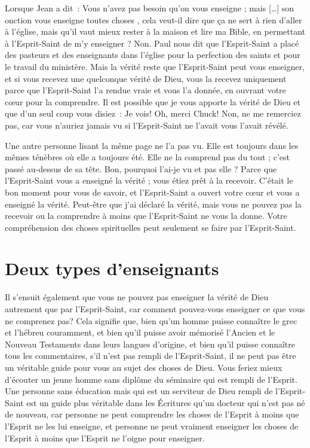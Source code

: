 \begin{specialpar}{}
Lorsque Jean a dit~:
 \og Vous n'avez pas besoin qu'on vous enseigne ;
 mais [\dots{}] son onction vous enseigne toutes choses \fg{},
 cela veut-il dire que ça ne sert à rien d'aller à l'église,
 mais qu'il vaut mieux rester à la maison et lire ma Bible,
 en permettant à l'Esprit-Saint de m'y enseigner ? Non.
 Paul nous dit que l'Esprit-Saint a placé des pasteurs
 et des enseignants dans l'église pour la perfection des saints
 et pour le travail du ministère.
 Mais la vérité reste que l'Esprit-Saint peut vous enseigner,
 et si vous recevez une quelconque vérité de Dieu,
 vous la recevez uniquement parce que l'Esprit-Saint
 l'a rendue vraie et vous l'a donnée, en ouvrant votre cœur
 pour la comprendre.
 Il est possible que je vous apporte la vérité de Dieu
 et que d'un seul coup vous disiez~: \og Je vois!
 Oh, merci Chuck! \fg{} Non, ne me remerciez pas,
 car vous n'auriez jamais vu si l'Esprit-Saint
 ne l'avait vous l'avait révélé.
\end{specialpar}

Une autre personne lisant la même page ne l'a pas vu.
 Elle est toujours dans les mêmes ténèbres où elle a toujours été.
 Elle ne la comprend pas du tout ; c'est passé au-dessus de sa tête.
 \og Bon, pourquoi l'ai-je vu et pas elle ? \fg{}
 Parce que l'Esprit-Saint vous a enseigné la vérité ;
 vous étiez prêt à la recevoir.
 C'était le bon moment pour vous de savoir, et l'Esprit-Saint
 a ouvert votre cœur et vous a enseigné la vérité.
 Peut-être que j'ai déclaré la vérité, mais vous ne pouvez pas la recevoir
 ou la comprendre à moins que l'Esprit-Saint ne vous la donne.
 Votre compréhension des choses spirituelles peut seulement se faire
 par l'Esprit-Saint.


\section*{Deux types d'enseignants}

Il s'ensuit également que vous ne pouvez pas enseigner
 la vérité de Dieu autrement que par l'Esprit-Saint,
 car comment pouvez-vous enseigner ce que vous ne comprenez pas?
 Cela signifie que, bien qu'un homme puisse connaître le grec et l'hébreu
 couramment, et bien qu'il puisse avoir mémorisé l'Ancien
 et le Nouveau Testaments dans leurs langues d'origine,
 et bien qu'il puisse connaître tous les commentaires,
 s'il n'est pas rempli de l'Esprit-Saint,
 il ne peut pas être un véritable guide pour vous
 au sujet des choses de Dieu.
 Vous feriez mieux d'écouter un jeune homme sans diplôme
 du séminaire qui est rempli de l'Esprit.
 Une personne sans éducation mais qui est un serviteur de Dieu
 rempli de l'Esprit-Saint est un guide plus véritable
 dans les Écritures qu'un docteur qui n'est pas né de nouveau,
 car personne ne peut comprendre les choses de l'Esprit
 à moins que l'Esprit ne les lui enseigne,
 et personne ne peut vraiment enseigner les choses de l'Esprit
 à moins que l'Esprit ne l'oigne pour enseigner.

